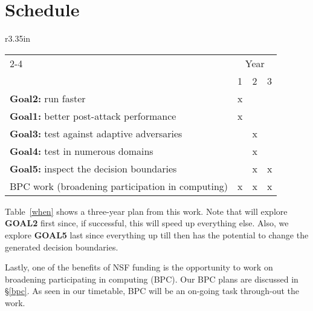 \section{Schedule} 


 \begin{wraptable}{r}{3.35in}
{ \footnotesize
\begin{tabular}{|l|l|l|l|}\cline{2-4}    
\multicolumn{1}{c|}{~}      &\multicolumn{3}{c|}{Year} \\
\multicolumn{1}{l|}{~}       &1 & 2 & 3  \\\hline  
{\bf Goal2:} run faster                   &   x  &  &   \\\hline 
{\bf Goal1:} better post-attack performance         &    x  &       &   \\\hline 
{\bf Goal3:} test against adaptive adversaries        &      & x      &   \\\hline  
{\bf Goal4:}  test in numerous domains                &      & x     &       \\ \hline
{\bf Goal5:} inspect the decision boundaries           &      & x      &  x     \\ \hline
BPC work (broadening participation in computing)  &   x &  x    & x     \\ \hline
\end{tabular} } 
\caption{Timetable for this work. }\label{when}
\end{wraptable}
Table~\ref{when} shows a three-year plan from this work.
Note that   will explore {\bf GOAL2} first since, if successful, this will speed up everything else.
Also,  we   explore {\bf GOAL5} last since everything up till
then has the potential to change the generated decision boundaries.

Lastly, 
one  of the benefits of  NSF funding
is the opportunity to work on  broadening participating in computing (BPC).  Our BPC plans are discussed in \S\ref{bpc}. As seen
  in our timetable, BPC will be an on-going task through-out the work.



